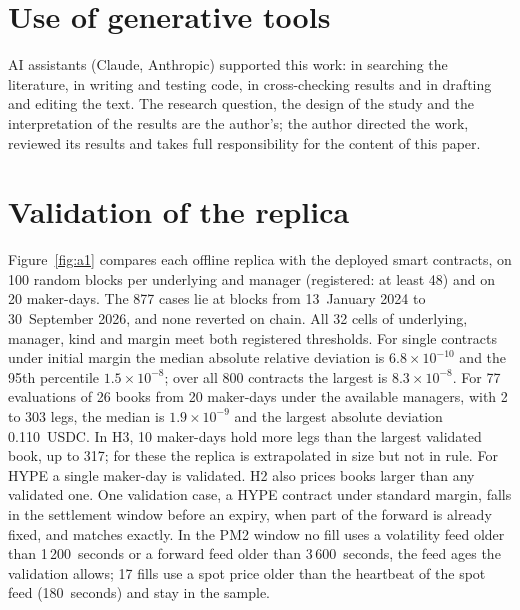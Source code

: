 \documentclass[a4paper,fleqn]{cas-dc}
\begin{document}
\section*{Use of generative tools}
AI assistants (Claude, Anthropic) supported this work: in searching the literature, in writing and testing code, in cross-checking results and in drafting and editing the text. The research question, the design of the study and the interpretation of the results are the author's; the author directed the work, reviewed its results and takes full responsibility for the content of this paper.

\appendix
\section{Validation of the replica}\label{app:validation}
Figure~\ref{fig:a1} compares each offline replica with the deployed smart contracts, on 100 random blocks per
underlying and manager (registered: at least 48) and on 20 maker-days. The 877 cases lie at blocks from
13~January 2024 to 30~September 2026, and none reverted on chain. All 32 cells of underlying, manager, kind
and margin meet both registered thresholds. For single contracts under initial margin the median absolute
relative deviation is ${6.8\times10^{-10}}$ and the 95th percentile ${1.5\times10^{-8}}$; over all 800 contracts the
largest is ${8.3\times10^{-8}}$. For 77 evaluations of 26 books from 20 maker-days under the available managers,
with 2 to 303 legs, the median is ${1.9\times10^{-9}}$ and the largest absolute deviation 0.110~USDC. In H3, 10
maker-days hold more legs than the largest validated book, up to 317; for these the replica is extrapolated
in size but not in rule. For HYPE a single maker-day is validated. H2 also prices books larger than any
validated one. One validation case, a HYPE contract under standard margin, falls in the settlement window before an expiry,
when part of the forward is already fixed, and matches exactly. In the PM2 window no fill uses a volatility feed older than 1\,200~seconds or a forward feed older
than 3\,600~seconds, the feed ages the validation allows; 17 fills use a spot price older than the heartbeat of the
spot feed (180~seconds) and stay in the sample.
\end{document}
